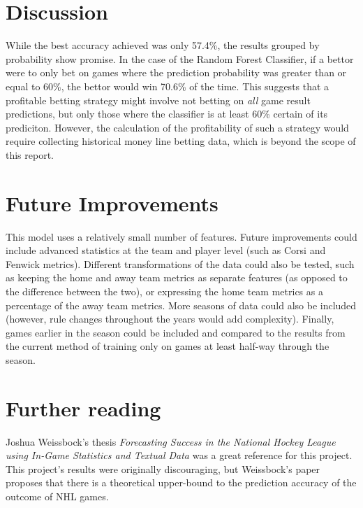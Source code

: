 \documentclass[letterpaper, 10 pt, conference]{ieeeconf}
\begin{document}
\section{Discussion}

While the best accuracy achieved was only 57.4\%, the results grouped by probability show promise. In the case of the Random Forest Classifier, if a bettor were to only bet on games where the prediction probability was greater than or equal to 60\%, the bettor would win 70.6\% of the time. This suggests that a profitable betting strategy might involve not betting on \textit{all} game result predictions, but only those where the classifier is at least 60\% certain of its prediciton. However, the calculation of the profitability of such a strategy would require collecting historical money line betting data, which is beyond the scope of this report.

\section{Future Improvements}

This model uses a relatively small number of features. Future improvements could include advanced statistics at the team and player level (such as Corsi and Fenwick metrics). Different transformations of the data could also be tested, such as keeping the home and away team metrics as separate features (as opposed to the difference between the two), or expressing the home team metrics as a percentage of the away team metrics. More seasons of data could also be included (however, rule changes throughout the years would add complexity). Finally, games earlier in the season could be included and compared to the results from the current method of training only on games at least half-way through the season.

\section*{Further reading}

Joshua Weissbock's thesis \textit{Forecasting Success in the National Hockey League using In-Game Statistics and Textual Data} was a great reference for this project. This project's results were originally discouraging, but Weissbock's paper proposes that there is a theoretical upper-bound to the prediction accuracy of the outcome of NHL games.
\end{document}
